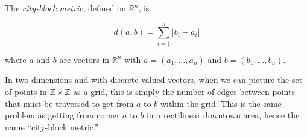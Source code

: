 \documentclass{article}
\begin{document}
The \emph{city-block metric}, defined on $\mathbb{R}^n$, is

$$ d(a,b) = \sum_{i=1}^n |b_i-a_i| $$

where $a$ and $b$ are vectors in $\mathbb{R}^n$ with $a=(a_1,\ldots,a_n)$ and $b=(b_1,\ldots,b_n)$.

In two dimensions and with discrete-valued vectors, when we can picture the set of points in $\mathbb{Z} \times \mathbb{Z}$ as a grid, this is simply the number of edges between points that must be traversed to get from $a$ to $b$ within the grid.  This is the same problem as getting from corner $a$ to $b$ in a rectilinear downtown area, hence the name ``city-block metric.''
\end{document}
